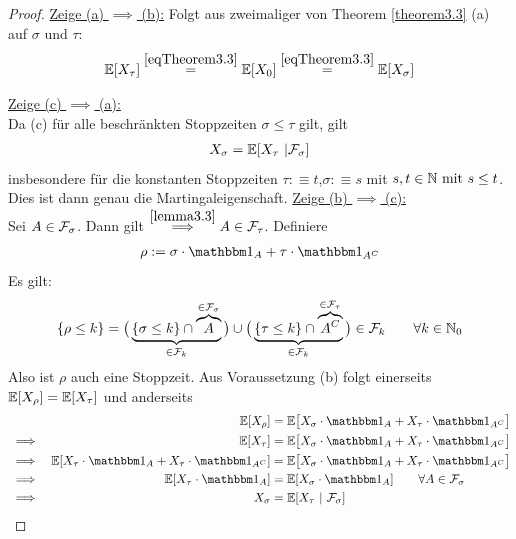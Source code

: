 \begin{proof}
	\underline{Zeige (a) $\implies$ (b):} 
	Folgt aus zweimaliger von Theorem \ref{theorem3.3} (a) auf $\sigma$ und $\tau$:
	\begin{align*}
		\mathbb{E}[X_\tau]\overset{\eqref{eqTheorem3.3}}{=}\mathbb{E}[X_0]\overset{\eqref{eqTheorem3.3}}{=}\mathbb{E}[X_\sigma]
	\end{align*}
	
	\underline{Zeige (c) $\implies$ (a):}\\
	Da (c) für alle beschränkten Stoppzeiten $\sigma\leq\tau$ gilt, gilt 
	\begin{align*}
		X_\sigma=\mathbb{E}[X_\tau~|\mathcal{F}_\sigma]
	\end{align*}
	insbesondere für die konstanten Stoppzeiten $\tau:\equiv t$,$\sigma:\equiv s$ mit $s,t\in\mathbb{N}\text{ mit } s\leq t$.
	Dies ist dann genau die Martingaleigenschaft.\nl
	\underline{Zeige (b) $\implies$ (c):}\\
	Sei $A\in\mathcal{F}_\sigma$. Dann gilt $\stackrel{\ref{lemma3.3}}{\implies} A\in\mathcal{F}_\tau$. Definiere
	\begin{align*}
		\rho:=\sigma\cdot\indi_A+\tau\cdot\indi_{A^C}
	\end{align*}
	Es gilt:
	\begin{align*}
		\lbrace\rho\leq k\rbrace=\big(\underbrace{\lbrace\sigma\leq k\rbrace\cap \overbrace{A}^{\in\mathcal{F}_\sigma}}_{\in\mathcal{F}_k}\big)\cup\big(\underbrace{\lbrace\tau\leq k\rbrace\cap \overbrace{A^C}^{\in\mathcal{F}_\tau}}_{\in\mathcal{F}_k}\big)\in\mathcal{F}_k\qquad\forall k\in\mathbb{N}_0
	\end{align*}
	Also ist $\rho$ auch eine Stoppzeit. Aus Voraussetzung (b) folgt einerseits $\mathbb{E}[X_\rho]=\mathbb{E}[X_\tau]$ und anderseits
	\begin{align*}
		&&\E[X_\rho]
		&=\E\big[X_\sigma\cdot\indi_A+X_\tau\cdot\indi_{A^C}\big]\\
		&\implies&
		\E[X_\tau]
		&=\E\big[X_\sigma\cdot\indi_A+X_\tau\cdot\indi_{A^C}\big]\\
		&\implies&
		\E[X_\tau\cdot \indi_A + X_\tau\cdot \indi_{A^C}]
		&=\E\big[X_\sigma\cdot\indi_A+X_\tau\cdot\indi_{A^C}\big]\\
		&\implies&
		\E[X_\tau\cdot\indi_A]
		&=\E[X_\sigma\cdot\indi_A]\qquad\forall A\in\F_\sigma\\
		&\implies&
		X_\sigma&=\E[X_\tau~|~\F_\sigma]
	\end{align*}
\end{proof}



